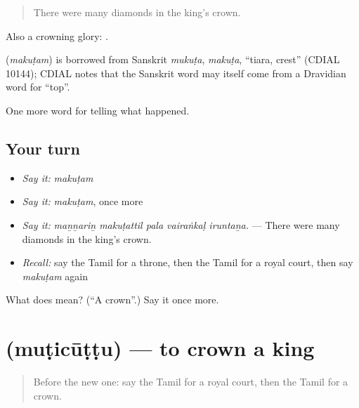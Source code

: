 \begin{quote}
There were many diamonds in the king's crown.
\end{quote}

Also a crowning glory:  .

\begin{cousinweb}
\textbf{} (\emph{makuṭam}) is borrowed from Sanskrit \emph{mukuṭa}, \emph{makuṭa}, \textquotedblleft{}tiara, crest\textquotedblright{} (CDIAL 10144); CDIAL notes that the Sanskrit word may itself come from a Dravidian word for \textquotedblleft{}top\textquotedblright{}.
\end{cousinweb}

\begin{grammarlens}[title={What you've built}]
One more word for telling what happened.
\end{grammarlens}

\subsection*{Your turn}
\begin{itemize}
\raggedright
  \item \emph{Say it:} \emph{makuṭam}
  \item \emph{Say it:} \emph{makuṭam}, once more
  \item \emph{Say it:} \emph{maṉṉariṉ makuṭattil pala vairaṅkaḷ iruntaṉa.} — There were many diamonds in the king's crown.
  \item \emph{Recall:} say the Tamil for a throne, then the Tamil for a royal court, then say \emph{makuṭam} again
\end{itemize}

\begin{tcolorbox}[breakable,colback=teal!4,colframe=teal!35!black,title={Before you move on}]
What does  mean? (\textquotedblleft{}A crown\textquotedblright{}.) Say it once more.
\end{tcolorbox}
\section[\texorpdfstring{\ta{முடிசூட்டு} (muṭicūṭṭu)}{முடிசூட்டு (muṭicūṭṭu)}]{ (muṭicūṭṭu) — to crown a king}

\label{lesson:TA-C329-muticuttu}



\begin{quote}
Before the new one: say the Tamil for a royal court, then the Tamil for a crown.
\end{quote}

